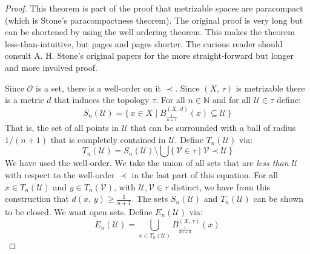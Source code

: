 \documentclass{article}
\theoremstyle{plain}
\theoremstyle{normal}
\begin{document}
        \begin{proof}
            This theorem is part of the proof that metrizable spaces are
            paracompact (which is Stone's paracompactness theorem). The
            original proof is very long but can be shortened by using the
            well ordering theorem. This makes the theorem less-than-intuitive,
            but pages and pages shorter. The curious reader should consult
            A. H. Stone's original papers for the more straight-forward but
            longer and more involved proof.
            \par\hfill\par
            Since $\mathcal{O}$ is a set, there is a well-order on it
            $\prec$. Since $(X,\,\tau)$ is metrizable there is a metric
            $d$ that induces the topology $\tau$. For all $n\in\mathbb{N}$
            and for all $\mathcal{U}\in\tau$ define:
            \begin{equation}
                S_{n}(\mathcal{U})=
                \{\,x\in{X}\;|\;
                    {B}_{\frac{1}{n+1}}^{(X,\,d)}(x)\subseteq\mathcal{U}\,\}
            \end{equation}
            That is, the set of all points in $\mathcal{U}$ that can be
            surrounded with a ball of radius $1/(n+1)$ that is completely
            contained in $\mathcal{U}$. Define $T_{n}(\mathcal{U})$ via:
            \begin{equation}
                T_{n}(\mathcal{U})=
                S_{n}(\mathcal{U})\setminus\bigcup
                    \big\{\,\mathcal{V}\in\tau\;|\;
                        \mathcal{V}\prec\mathcal{U}\,\big\}
            \end{equation}
            We have used the well-order. We take the union of all sets that are
            \textit{less than} $\mathcal{U}$ with respect to the well-order
            $\prec$ in the last part of this equation. For all
            $x\in{T}_{n}(\mathcal{U})$ and $y\in{T}_{n}(\mathcal{V})$, with
            $\mathcal{U},\mathcal{V}\in\tau$ distinct, we have from this
            construction that $d(x,\,y)\geq\frac{1}{n+1}$. The sets
            $S_{n}(\mathcal{U})$ and $T_{n}(\mathcal{U})$ can be shown to be
            closed. We want open sets. Define $E_{n}(\mathcal{U})$ via:
            \begin{equation}
                E_{n}(\mathcal{U})=
                \bigcup_{x\in{T}_{n}(\mathcal{U})}
                B_{\frac{1}{3n+3}}^{(X,\,\tau)}(x)
            \end{equation}

\end{proof}
\end{document}
